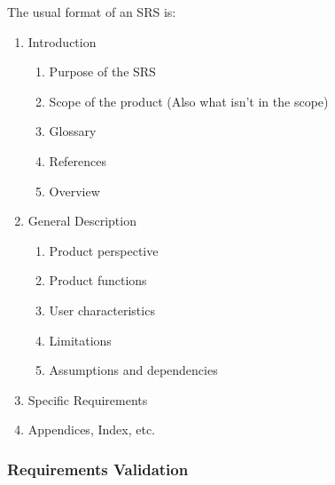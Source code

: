 \documentclass[
../../Software_Engineering_Summary.tex,
]
{subfiles}
\begin{document}
The usual format of an SRS is:

\begin{defbox}
    \begin{enumerate}
        \item Introduction
        \begin{enumerate}
            \item Purpose of the SRS
            \item Scope of the product (Also what isn't in the scope)
            \item Glossary
            \item References
            \item Overview
        \end{enumerate}
        \item General Description
        \begin{enumerate}
            \item Product perspective
            \item Product functions
            \item User characteristics
            \item Limitations
            \item Assumptions and dependencies
        \end{enumerate}
        \item Specific Requirements
        \item Appendices, Index, etc.
    \end{enumerate}
\end{defbox}

\subsubsection{Requirements Validation}
\end{document}
